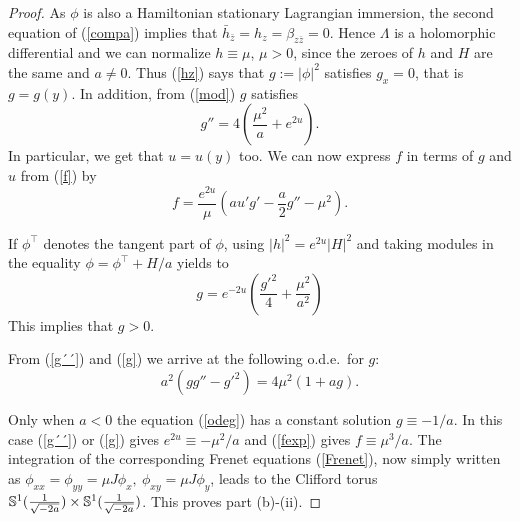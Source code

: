 \documentclass[leqno,11pt]{amsart}
\begin{document}
\begin{proof}
 As $\phi $ is also a Hamiltonian stationary Lagrangian
immersion, the second equation of (\ref{compa}) implies that
$\bar{h}_{\bar{z}}=h_z=\beta_{z \overline{z}}=0$. Hence $\Lambda$
is a holomorphic differential and we can normalize $h\equiv \mu$,
$\mu >0$, since the zeroes of $h$ and $H$ are the same and $a\neq
0$. Thus (\ref{hz}) says that $g:=|\phi|^2$ satisfies $g_x=0$,
that is $g=g(y)$. In addition, from (\ref{mod}) $g$ satisfies
\begin{equation}\label{g´´}
g''=4\left(\frac{\mu^2}{a}+e^{2u} \right).
\end{equation}
In particular, we get that $u=u(y)$ too. We can now express $f$ in
terms of $g$ and $u$ from (\ref{f}) by
\begin{equation}\label{fexp}
f=\frac{e^{2u}}{\mu}\left(a u'g'-\frac{a}{2}g''-\mu^2 \right).
\end{equation}

If $\phi^\top$ denotes the tangent part of $\phi$, using
$|h|^2=e^{2u}|H|^2$ and taking modules in the equality
$\phi=\phi^\top+H/a$ yields to
\begin{equation}\label{g}
g=e^{-2u}\left( \frac{g'^2}{4}+\frac{\mu^2}{a^2} \right)
\end{equation}
This implies that $g>0$.

From (\ref{g´´}) and (\ref{g}) we arrive at the following o.d.e.\ for $g$:
\begin{equation}\label{odeg}
a^2(g g'' - g'^2)=4\mu^2(1+a g).
\end{equation}

Only when $a<0$ the equation (\ref{odeg}) has a constant solution
$g\equiv -1/a$. In this case (\ref{g´´}) or (\ref{g}) gives
$e^{2u}\equiv -\mu^2/a$ and (\ref{fexp}) gives $f\equiv \mu^3/a$.
The integration of the corresponding Frenet equations
(\ref{Frenet}), now simply written as $\phi_{xx}=\phi_{yy}=\mu
J\phi_x, \ \phi_{xy}=\mu J\phi_y$, leads to the Clifford torus
${\mathbb{S}}^1({1\over \sqrt{-2a}})\times {\mathbb{S}}^1({1\over\sqrt{-2a}})$. This
proves part (b)-(ii).


\end{proof}
\end{document}
